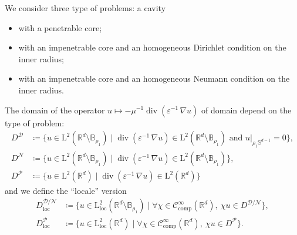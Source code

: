 \documentclass[12pt,a4paper]{article}
\theoremstyle{definition}
\theoremstyle{plain}
\theoremstyle{remark}
\newcommand{\bbB}{\mathbb{B}}
\newcommand{\bbR}{\mathbb{R}}
\newcommand{\bbS}{\mathbb{S}}
\newcommand{\calD}{\mathcal{D}}
\newcommand{\calN}{\mathcal{N}}
\newcommand{\calP}{\mathcal{P}}
\newcommand{\scrC}{\mathscr{C}}
\newcommand{\rmL}{\mathrm{L}}
\DeclareMathOperator{\Div}{div}
\newcommand{\restr}[2]{\left. #1\right\vert_{#2}}
\newcommand{\eps}{\varepsilon}
\newcommand{\comp}{\mathrm{comp}}
\newcommand{\loc}{\mathrm{loc}}
\begin{document}
We consider three type of problems: a cavity
\begin{itemize}
    \item with a penetrable core;
    \item with an impenetrable core and an homogeneous Dirichlet condition on the inner radius;
    \item with an impenetrable core and an homogeneous Neumann condition on the inner radius.
\end{itemize}
The domain of the operator \(u \mapsto -\mu^{-1}\Div(\eps^{-1}\, \nabla u)\) of domain depend on the type of problem:
\begin{align*}
    D^\calD & \coloneqq \{u \in \rmL^2(\bbR^d \setminus \bbB_{\rho_1}) \mid \Div(\eps^{-1}\, \nabla u) \in \rmL^2(\bbR^d \setminus \bbB_{\rho_1}) \text{ and } \restr{u}{\rho_1\bbS^{d-1}} = 0\}, \\
    D^\calN & \coloneqq \{u \in \rmL^2(\bbR^d \setminus \bbB_{\rho_1}) \mid \Div(\eps^{-1}\, \nabla u) \in \rmL^2(\bbR^d \setminus \bbB_{\rho_1})\},                                              \\
    D^\calP & \coloneqq \{u \in \rmL^2(\bbR^d) \mid \Div(\eps^{-1}\, \nabla u) \in \rmL^2(\bbR^d)\}
\end{align*}
and we define the ``locale'' version
\begin{align*}
    D_\loc^{\calD/\calN} & \coloneqq \{u \in \rmL_\loc^2(\bbR^d \setminus \bbB_{\rho_1}) \mid \forall \chi \in \scrC_\comp^\infty(\bbR^d),\ \chi u \in D^{\calD/\calN}\}, \\
    D_\loc^\calP         & \coloneqq \{u \in \rmL_\loc^2(\bbR^d) \mid \forall \chi \in \scrC_\comp^\infty(\bbR^d),\ \chi u \in D^\calP\}.
\end{align*}

\bigskip
\end{document}
